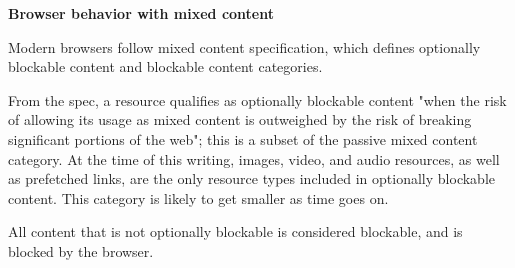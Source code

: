 \documentclass[14pt,a4paper,final]{extreport}
\begin{document}
\item \textbf{Browser behavior with mixed content}
\item Modern browsers follow mixed content specification, which defines optionally blockable content and blockable content categories.

From the spec, a resource qualifies as optionally blockable content "when the risk of allowing its usage as mixed content is outweighed by the risk of breaking significant portions of the web"; this is a subset of the passive mixed content category. At the time of this writing, images, video, and audio resources, as well as prefetched links, are the only resource types included in optionally blockable content. This category is likely to get smaller as time goes on.

All content that is not optionally blockable is considered blockable, and is blocked by the browser.
\end{document}
